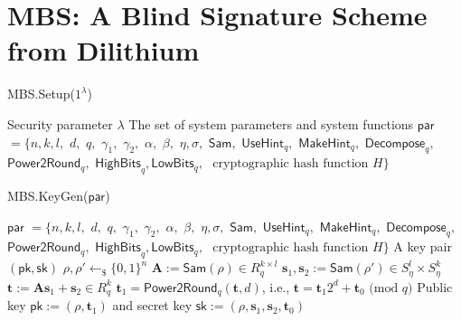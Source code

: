 \documentclass[conference]{IEEEtran}
\begin{document}
	
	\fi
	
	\section{\textsf{MBS}: A Blind Signature Scheme from \textsf{Dilithium}}
	\label{brssc}
	
	\begin{algorithm}[pt]
		\caption{\textsf{MBS.Setup($1^{\lambda}$)}}
		\label{alg:1}
		\begin{algorithmic}[1]
			
			\REQUIRE Security parameter $\lambda$
			\ENSURE The set of system parameters and system functions $\mathsf{par}$ $= \{n, k, l,$  $d,$  $q, $ $\gamma_1,$ $ \gamma_2,$  $\alpha,$ $ \beta,$ $ \eta, \sigma,$  $\textsf{Sam},$ $ \textsf{UseHint}_q,$ $ \textsf{MakeHint}_q,$ $ \textsf{Decompose}_q, $ $ \textsf{Power2Round}_q,$ $ \textsf{HighBits}_q, \textsf{LowBits}_q,$  $ \text{ cryptographic hash function } H \}$
		\end{algorithmic}
		\label{setup}
	\end{algorithm}
	
	
	
	
	\begin{algorithm}[pt]
		\caption{\textsf{MBS.KeyGen($\mathsf{par}$)}}
		\label{alg:10}
		\begin{algorithmic}[1]
			
			\REQUIRE $\mathsf{par}$ $= \{n, k, l,$  $d,$  $q, $ $\gamma_1,$ $ \gamma_2,$  $\alpha,$ $ \beta,$ $ \eta, \sigma,$  $\textsf{Sam},$ $ \textsf{UseHint}_q,$ $ \textsf{MakeHint}_q,$ $ \textsf{Decompose}_q, $ $ \textsf{Power2Round}_q,$ $ \textsf{HighBits}_q, \textsf{LowBits}_q,$  $ \text{ cryptographic hash function } H \}$
			\ENSURE A key pair $(\mathsf{pk},\mathsf{sk})$
			\STATE $\rho, \rho' \leftarrow_{\$} \{0,1\}^{n}$
			\STATE $\mathbf{A} :=\textsf{Sam}(\rho)\in R_q^{k \times l}$
			\STATE $\mathbf{s}_1, \mathbf{s}_2 :=\textsf{Sam}(\rho')\in S_\eta^{l} \times  S_\eta^{k}$
			\STATE $\mathbf{t} :=\mathbf{A}\mathbf{s}_1+\mathbf{s}_2 \in R_q^{k}$
			\STATE $\mathbf{t}_1=\textsf{Power2Round}_q(\mathbf{t},d)$, i.e., $\mathbf{t}=\mathbf{t}_1 2^d+\mathbf{t}_0 \text{ (mod } q)$
			\RETURN Public key $\textsf{pk}:=(\rho,\mathbf{t}_1)$ and secret key $\textsf{sk}:=(\rho,\mathbf{s}_1,\mathbf{s}_2,\mathbf{t}_0)$
		\end{algorithmic}
		\label{keygen}
	\end{algorithm}
	
\end{document}

